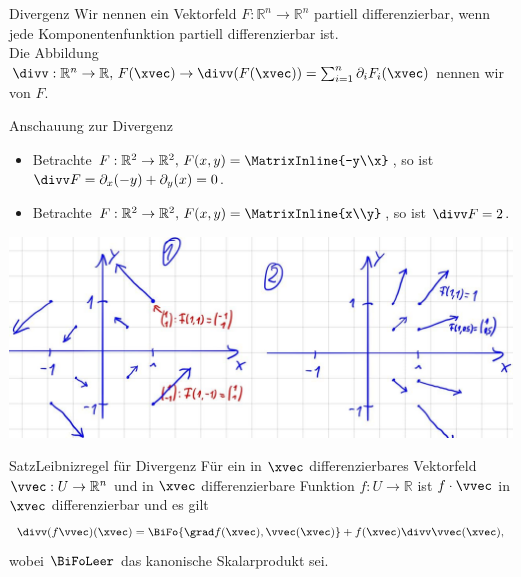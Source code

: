 \begin{Def}
{Divergenz}
Wir nennen ein Vektorfeld $F:\mathbb{R}^n\to\mathbb{R}^n$ partiell differenzierbar, wenn jede Komponentenfunktion partiell differenzierbar ist.\\
Die Abbildung $\divv:\mathbb{R}^n\to\mathbb{R},\,F(\xvec)\to\divv(F(\xvec))=\sum_{i=1}^n\partial_iF_i(\xvec)$ nennen wir  von $F$.
\end{Def}
\begin{Beispiel}
{Anschauung zur Divergenz}
\begin{itemize}
    \item Betrachte $F:\mathbb{R}^2\to\mathbb{R}^2,\,F(x,y)=\MatrixInline{-y\\x}$, so ist $\divv F=\partial_x(-y)+\partial_y(x)=0$.
    \item Betrachte $F:\mathbb{R}^2\to\mathbb{R}^2,\,F(x,y)=\MatrixInline{x\\y}$, so ist $\divv F=2$.
\end{itemize}
    \begin{center}
\includegraphics[width=.35\textwidth]{Dateien/07/07Vektorfelder.jpg}
    \end{center}
\end{Beispiel}
\begin{Satz}
{Satz}{Leibnizregel für Divergenz}
Für ein in $\xvec$ differenzierbares Vektorfeld $\vvec:U\to\mathbb{R}^n$ und in $\xvec$ differenzierbare Funktion $f:U\to \mathbb{R}$ ist $f\cdot \vvec$ in $\xvec$ differenzierbar und es gilt
\begin{equation}
    \divv (f\vvec)(\xvec)=\BiFo{\grad f(\xvec),\vvec(\xvec)}+f(\xvec)\divv\vvec(\xvec),
\end{equation}
wobei $\BiFoLeer$ das kanonische Skalarprodukt sei.
\end{Satz}

